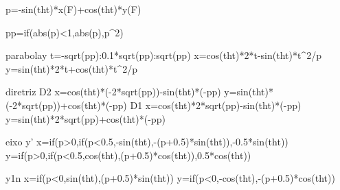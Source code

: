 p=-sin(tht)*x(F)+cos(tht)*y(F)

pp=if(abs(p)<1,abs(p),p^2)

parabolay
t=-sqrt(pp):0.1*sqrt(pp):sqrt(pp)
x=cos(tht)*2*t-sin(tht)*t^2/p
y=sin(tht)*2*t+cos(tht)*t^2/p


diretriz
D2
x=cos(tht)*(-2*sqrt(pp))-sin(tht)*(-pp)
y=sin(tht)*(-2*sqrt(pp))+cos(tht)*(-pp)
D1
x=cos(tht)*2*sqrt(pp)-sin(tht)*(-pp)
y=sin(tht)*2*sqrt(pp)+cos(tht)*(-pp)



eixo y'
x=if(p>0,if(p<0.5,-sin(tht),-(p+0.5)*sin(tht)),-0.5*sin(tht))
y=if(p>0,if(p<0.5,cos(tht),(p+0.5)*cos(tht)),0.5*cos(tht))

y1n
x=if(p<0,sin(tht),(p+0.5)*sin(tht))
y=if(p<0,-cos(tht),-(p+0.5)*cos(tht))
